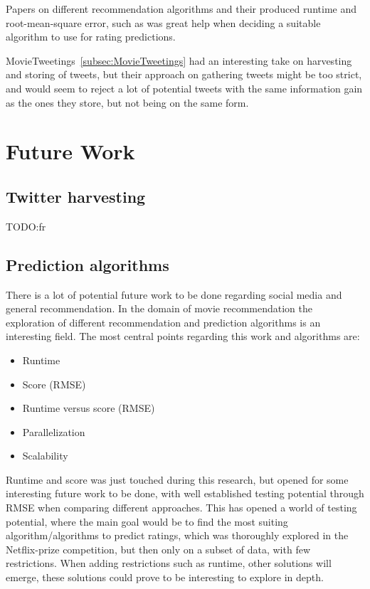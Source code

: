 Papers on different recommendation algorithms and their produced runtime and root-mean-square error, such as \cite{bigchaos-sol,alsMPI,BellKor-CF-TD} was great help when deciding a suitable algorithm to use for rating predictions.

MovieTweetings~\ref{subsec:MovieTweetings} had an interesting take on harvesting and storing of tweets, but their approach on gathering tweets might be too strict, and would seem to reject a lot of potential tweets with the same information gain as the ones they store, but not being on the same form.




\section{Future Work}
\subsection{Twitter harvesting}
TODO:fr



\subsection{Prediction algorithms}
There is a lot of potential future work to be done regarding social media and general recommendation. In the domain of movie recommendation the exploration of different recommendation and prediction algorithms is an interesting field. The most central points regarding this work and algorithms are:

\begin{itemize}
    \item Runtime
    \item Score (RMSE)
    \item Runtime versus score (RMSE)
    \item Parallelization
    \item Scalability
\end{itemize}

Runtime and score was just touched during this research, but opened for some interesting future work to be done, with well established testing potential through RMSE when comparing different approaches. This has opened a world of testing potential, where the main goal would be to find the most suiting algorithm/algorithms to predict ratings, which was thoroughly explored in the Netflix-prize competition, but then only on a subset of data, with few restrictions. When adding restrictions such as runtime, other solutions will emerge, these solutions could prove to be interesting to explore in depth.

